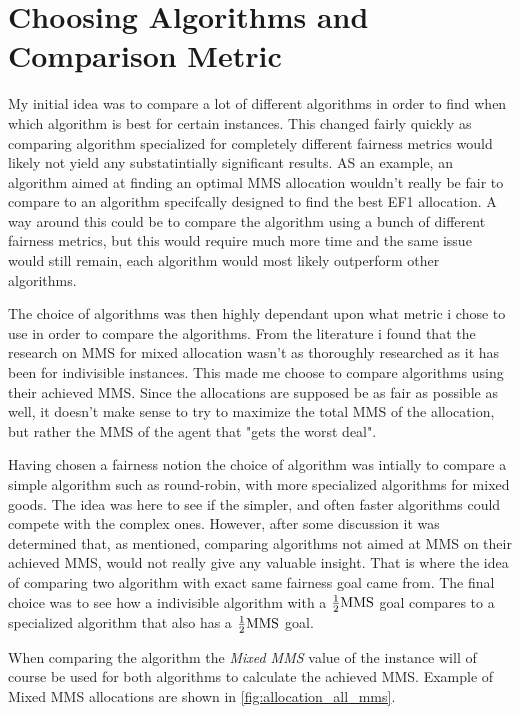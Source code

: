 \section{Choosing Algorithms and Comparison Metric}\label{sec:choosing-algorithms}

My initial idea was to compare a lot of different algorithms in order to find when which algorithm is best for certain instances. This changed fairly quickly as comparing algorithm specialized for completely different fairness metrics would likely not yield any substatintially significant results. AS an example, an algorithm aimed at finding an optimal MMS allocation wouldn't really be fair to compare to an algorithm specifcally designed to find the best EF1 allocation. A way around this could be to compare the algorithm using a bunch of different fairness metrics, but this would require much more time and the same issue would still remain, each algorithm would most likely outperform other algorithms. 

The choice of algorithms was then highly dependant upon what metric i chose to use in order to compare the algorithms. From the literature i found that the research on MMS for mixed allocation wasn't as thoroughly researched as it has been for indivisible instances. This made me choose to compare algorithms using their achieved MMS. Since the allocations are supposed be as fair as possible as well, it doesn't make sense to try to maximize the total MMS of the allocation, but rather the MMS of the agent that "gets the worst deal".

Having chosen a fairness notion the choice of algorithm was intially to compare a simple algorithm such as round-robin, with more specialized algorithms for mixed goods. The idea was here to see if the simpler, and often faster algorithms could compete with the complex ones. However, after some discussion it was determined that, as mentioned, comparing algorithms not aimed at MMS on their achieved MMS, would not really give any valuable insight. That is where the idea of comparing two algorithm with exact same fairness goal came from. The final choice was to see how a indivisible algorithm with a $\frac{1}{2}\text{MMS}$ goal compares to a specialized algorithm that also has a $\frac{1}{2}\text{MMS}$ goal. 

When comparing the algorithm the \textit{Mixed MMS} value of the instance will of course be used for both algorithms to calculate the achieved MMS. Example of Mixed MMS allocations are shown in \autoref{fig:allocation_all_mms}.

